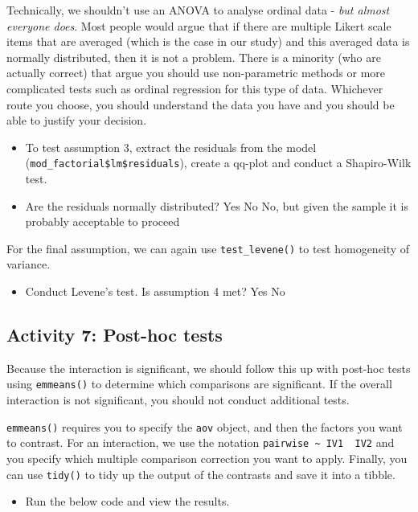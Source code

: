 \documentclass[]{book}
\providecommand{\tightlist}{%
  \setlength{\itemsep}{0pt}\setlength{\parskip}{0pt}}
\begin{document}
Technically, we shouldn't use an ANOVA to analyse ordinal data - \emph{but almost everyone does}. Most people would argue that if there are multiple Likert scale items that are averaged (which is the case in our study) and this averaged data is normally distributed, then it is not a problem. There is a minority (who are actually correct) that argue you should use non-parametric methods or more complicated tests such as ordinal regression for this type of data. Whichever route you choose, you should understand the data you have and you should be able to justify your decision.

\begin{itemize}
\item
  To test assumption 3, extract the residuals from the model (\texttt{mod\_factorial\$lm\$residuals}), create a qq-plot and conduct a Shapiro-Wilk test.
\item
  Are the residuals normally distributed? Yes No No, but given the sample it is probably acceptable to proceed
\end{itemize}

For the final assumption, we can again use \texttt{test\_levene()} to test homogeneity of variance.

\begin{itemize}
\tightlist
\item
  Conduct Levene's test. Is assumption 4 met? Yes No
\end{itemize}

\hypertarget{activity-7-post-hoc-tests}{%
\subsection{Activity 7: Post-hoc tests}\label{activity-7-post-hoc-tests}}

Because the interaction is significant, we should follow this up with post-hoc tests using \texttt{emmeans()} to determine which comparisons are significant. If the overall interaction is not significant, you should not conduct additional tests.

\texttt{emmeans()} requires you to specify the \texttt{aov} object, and then the factors you want to contrast. For an interaction, we use the notation \texttt{pairwise\ \textasciitilde{}\ IV1\ \textbar{}\ IV2} and you specify which multiple comparison correction you want to apply. Finally, you can use \texttt{tidy()} to tidy up the output of the contrasts and save it into a tibble.

\begin{itemize}
\tightlist
\item
  Run the below code and view the results.
\end{itemize}
\end{document}
